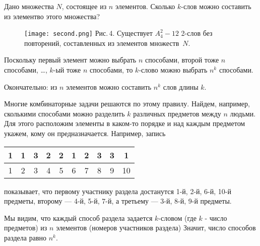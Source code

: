 Дано множества $N$, состоящее из $n$ элементов. Сколько $k$-слов можно составить из элементво этого множества?

\begin{figure}[t]
	\texttt{[image: second.png]}
	\footnotesize
	Рис.\,4. Существует $A^2_4 - 12$ 2-слов без повторений, составленных из элементов множеств~$N$.
\end{figure}


Поскольку первый элемент можно выбрать $n$ способами, второй тоже $n$ способами, \dots, $k$-ый тоже $n$ способами, то $k$-слово можно выбрать $n^k$ способами.

Окончательно: из $n$ элементов можно составить $n^k$ слов длины $k$.

Многие комбинаторные задачи решаются по этому правилу. Найдем, например, сколькими способами можно разделить $k$ различных предметов между $n$ людьми. Для этого расположим элементы в каком-то порядке и над каждым предметом укажем, кому он предназначается. Например, запись

\vspace{2mm}
\setlength{\extrarowheight}{3 mm}
\noindent
\begin{tabular}{|c|c|c|c|c|c|c|c|c|c|}
	\hline 1 & 1 & 3 & 2 & 2 & 1 & 2 & 3 & 3 & 1 \\ [5pt]
	\hline 1 & 2 & 3 & 4 & 5 & 6 & 7 & 8 & 9 & 10 \\ [5pt]
	\hline	
\end{tabular}
\setlength{\extrarowheight}{0 mm}

\vspace{2mm}
\noindent показывает, что первому участнику раздела достанутся 1-й, 2-й, 6-й, 10-й предметы, второму --- 4-й, 5-й, 7-й, а третьему --- 3-й, 8-й, 9-й предметы.

Мы видим, что каждый способ раздела задается $k$-словом (где $k$ - число предметов) из $n$ элементов (номеров участников раздела) Значит, число способов раздела равно $n^k$.
